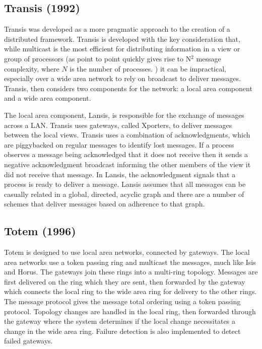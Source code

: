 \subsection{Transis (1992)}

Transis \cite{TRANSISTOOLKIT} was developed as a more pragmatic approach to the creation of a distributed framework. Transis is developed with the key consideration that, while multicast is the most efficient for distributing information in a view or group of processors (as point to point quickly gives rise to N$^{2}$ message complexity, where $N$ is the number of processes. ) it can be impractical, especially over a wide area network to rely on broadcast to deliver messages. Transis, then considers two components for the network: a local area component and a wide area component.

The local area component, Lansis, is responsible for the exchange of messages across a LAN. Transis uses gateways, called Xporters, to deliver messages between the local views. Transis uses a combination of acknowledgments, which are piggybacked on regular messages to identify lost messages. If a process observes a message being acknowledged that it does not receive then it sends a negative acknowledgment broadcast informing the other members of the view it did not receive that message. In Lansis, the acknowledgment signals that a process is ready to deliver a message. Lansis assumes that all messages can be casually related in a global, directed, acyclic graph and there are a number of schemes that deliver messages based on adherence to that graph.

\subsection{Totem (1996)}

Totem\cite{TOTEMTOOLKIT} is designed to use local area networks, connected by gateways. The local area networks use a token passing ring and multicast the messages, much like Isis and Horus. The gateways join these rings into a multi-ring topology. Messages are first delivered on the ring which they are sent, then forwarded by the gateway which connects the local ring to the wide area ring for delivery to the other rings. The message protocol gives the message total ordering using a token passing protocol. Topology changes are handled in the local ring, then forwarded through the gateway where the system determines if the local change necessitates a change in the wide area ring. Failure detection is also implemented to detect failed gateways.
                                             
